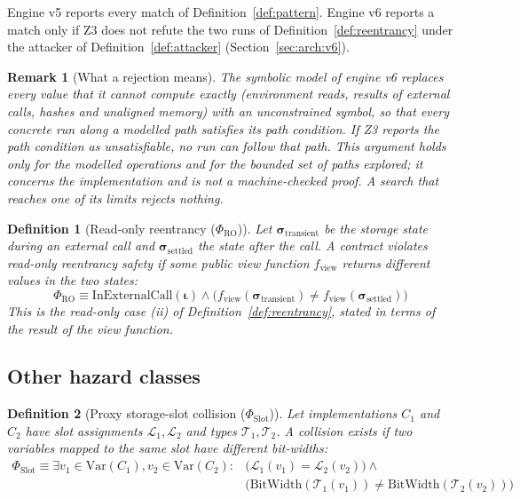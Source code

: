 \documentclass[pdflatex,sn-mathphys]{sn-jnl}
\theoremstyle{thmstyletwo}
\newtheorem{definition}{Definition}
\theoremstyle{thmstyletwo}
\newtheorem{remark}{Remark}
\begin{document}
Engine v5 reports every match of Definition~\ref{def:pattern}. Engine v6 reports a match only if Z3 does not refute the two runs of Definition~\ref{def:reentrancy} under the attacker of Definition~\ref{def:attacker} (Section~\ref{sec:arch:v6}).

\begin{remark}[What a rejection means]\label{rem:rejection}
The symbolic model of engine v6 replaces every value that it cannot compute exactly (environment reads, results of external calls, hashes and unaligned memory) with an unconstrained symbol, so that every concrete run along a modelled path satisfies its path condition. If Z3 reports the path condition as unsatisfiable, no run can follow that path. This argument holds only for the modelled operations and for the bounded set of paths explored; it concerns the implementation and is not a machine-checked proof. A search that reaches one of its limits rejects nothing.
\end{remark}

\begin{definition}[Read-only reentrancy ($\Phi_{\mathrm{RO}}$)]\label{prop:ro}
Let $\mathbf{\sigma}_{\mathrm{transient}}$ be the storage state during an external call and $\mathbf{\sigma}_{\mathrm{settled}}$ the state after the call. A contract violates read-only reentrancy safety if some public view function $f_{\mathrm{view}}$ returns different values in the two states:
\begin{equation}
    \Phi_{\mathrm{RO}} \equiv \mathrm{InExternalCall}(\mathbf{\iota}) \land \Big( f_{\mathrm{view}}(\mathbf{\sigma}_{\mathrm{transient}}) \neq f_{\mathrm{view}}(\mathbf{\sigma}_{\mathrm{settled}}) \Big)
\end{equation}
This is the read-only case (ii) of Definition~\ref{def:reentrancy}, stated in terms of the result of the view function.
\end{definition}

\subsection{Other hazard classes}\label{sec:math:invariants}

\begin{definition}[Proxy storage-slot collision ($\Phi_{\mathrm{Slot}}$)]\label{prop:proxy}
Let implementations $C_1$ and $C_2$ have slot assignments $\mathcal{L}_1, \mathcal{L}_2$ and types $\mathcal{T}_1, \mathcal{T}_2$. A collision exists if two variables mapped to the same slot have different bit-widths:
\begin{equation}
\begin{aligned}
    \Phi_{\mathrm{Slot}} \equiv \exists v_1 \in \mathrm{Var}(C_1), v_2 \in \mathrm{Var}(C_2) : {} & \big( \mathcal{L}_1(v_1) = \mathcal{L}_2(v_2) \big) \land {} \\
    & \big( \mathrm{BitWidth}(\mathcal{T}_1(v_1)) \neq \mathrm{BitWidth}(\mathcal{T}_2(v_2)) \big)
\end{aligned}
\end{equation}
\end{definition}
\end{document}
